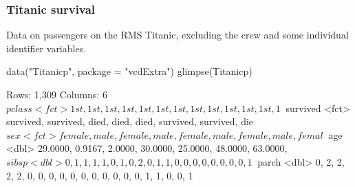 \documentclass[a4paper]{article}\usepackage[]{graphicx}\usepackage[]{xcolor}
\begin{document}
\subsubsection{Titanic survival}
Data on passengers on the RMS Titanic, excluding the crew and some individual identifier variables.
\begin{Schunk}
\begin{Sinput}
data("Titanicp", package = "vcdExtra")
glimpse(Titanicp)
\end{Sinput}
\begin{Soutput}
Rows: 1,309
Columns: 6
$ pclass   <fct> 1st, 1st, 1st, 1st, 1st, 1st, 1st, 1st, 1st, 1st, 1st, 1st, 1~
$ survived <fct> survived, survived, died, died, died, survived, survived, die~
$ sex      <fct> female, male, female, male, female, male, female, male, femal~
$ age      <dbl> 29.0000, 0.9167, 2.0000, 30.0000, 25.0000, 48.0000, 63.0000, ~
$ sibsp    <dbl> 0, 1, 1, 1, 1, 0, 1, 0, 2, 0, 1, 1, 0, 0, 0, 0, 0, 0, 0, 0, 1~
$ parch    <dbl> 0, 2, 2, 2, 2, 0, 0, 0, 0, 0, 0, 0, 0, 0, 0, 0, 1, 1, 0, 0, 1~
\end{Soutput}
\end{Schunk}
\end{document}
